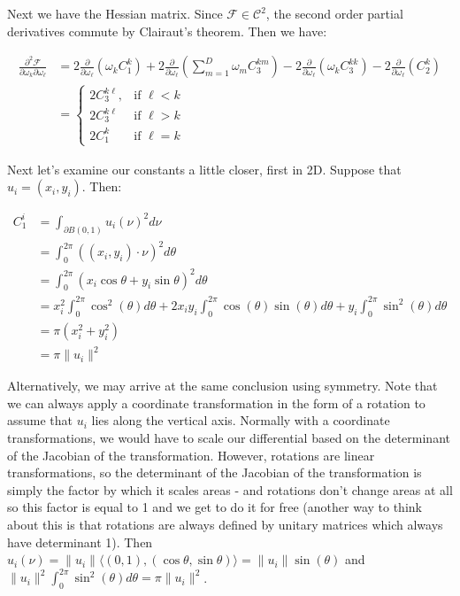 \documentclass[12pt]{article}
\begin{document}
Next we have the Hessian matrix. Since $\mathcal{F}\in \mathcal{C}^2$, the second order partial derivatives commute by Clairaut's theorem. Then we have:

\begin{align*}
	\frac{\partial^2 \mathcal{F}}{\partial \omega_k \partial \omega_\ell} &= 2\frac{\partial}{\partial \omega_\ell} \left(\omega_k C_1^k\right) + 2 \frac{\partial}{\partial \omega_\ell} \left(  \sum_{m=1}^{D}\omega_{m}C_{3}^{km} \right) - 2\frac{\partial}{\partial \omega_\ell} \left( \omega_kC_3^{kk} \right) - 2 \frac{\partial}{\partial \omega_\ell} \left(C_2^k \right)\\
	&= \begin{cases}
		2C_3^{k\ell}, & \text{if $\ell < k$}\\
		2C_3^{k\ell} & \text{if $\ell > k$ }\\
		2C_1^k & \text{if $\ell = k$} 
	\end{cases}
\end{align*}

Next let's examine our constants a little closer, first in 2D. Suppose that $u_i = (x_i,y_i)$. Then:

\begin{align*}
C_1^i &= \int_{\partial B(0,1)} u_i(\nu)^2 d\nu\\
&= \int_0^{2\pi} ((x_i,y_i) \cdot \nu)^2 d\theta\\
&= \int_0^{2\pi} (x_i \cos \theta + y_i \sin \theta)^2 d\theta\\
&= x_i^2 \int_0^{2\pi} \cos^2(\theta)d\theta + 2x_iy_i \int_0^{2\pi} \cos(\theta) \sin(\theta)d\theta  + y_i \int_0^{2\pi} \sin^2(\theta) d\theta\\
&=  \pi(x_i^2+y_i^2)\\
&= \pi\|u_i\|^2 
\end{align*}

Alternatively, we may arrive at the same conclusion using symmetry. Note that we can always apply a coordinate transformation in the form of a rotation to assume that $u_i$ lies along the vertical axis. Normally with a coordinate transformations, we would have to scale our differential based on the determinant of the Jacobian of the transformation. However, rotations are linear transformations, so the determinant of the Jacobian of the transformation is simply the factor by which it scales areas - and rotations don't change areas at all so this factor is equal to 1 and we get to do it for free (another way to think about this is that rotations are always defined by unitary matrices which always have determinant 1). Then $u_i(\nu) = \|u_i \|\langle (0,1), (\cos \theta,\sin \theta)\rangle = \|u_i\| \sin(\theta)$ and $\|u_i\|^2 \int_0^{2\pi} \sin^2(\theta)d\theta = \pi\|u_i\|^2$.\\
\end{document}
